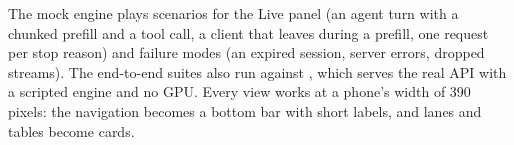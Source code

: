 The mock engine plays scenarios for the Live panel (an agent turn with a chunked prefill and a tool call, a client that leaves during a prefill, one request per stop reason) and failure modes (an expired session, server errors, dropped streams). The end-to-end suites also run against , which serves the real API with a scripted engine and no GPU. Every view works at a phone's width of 390 pixels: the navigation becomes a bottom bar with short labels, and lanes and tables become cards.
